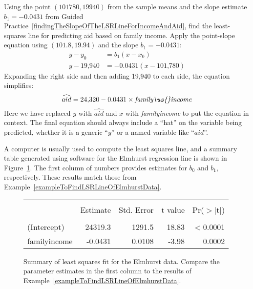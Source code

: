 \begin{examplewrap}
\begin{nexample}{Using the point $(101780, 19940)$
    from the sample means and the slope estimate
    $b_1 = -0.0431$ from Guided
    Practice~\ref{findingTheSlopeOfTheLSRLineForIncomeAndAid},
    find the least-squares line for predicting aid based
    on family income.}
  \label{exampleToFindLSRLineOfElmhurstData}%
  Apply the point-slope equation using $(101.8, 19.94)$
  and the slope $b_1 = -0.0431$:
  \begin{align*}
  y - y_0    &= b_1 (x - x_0) \\
  y - \text{19,940}  &= -0.0431(x - \text{101,780})
  \end{align*}
  Expanding the right side and then adding 19,940 to each side,
  the equation simplifies:
  \begin{align*}
  \widehat{aid} = \text{24,320} - 0.0431 \times
      \textit{family\us{}income}
  \end{align*}
  Here we have replaced $y$ with $\widehat{aid}$ and $x$ with
  \textit{family\us{}income} to put the equation in context.
  The final equation should always include a ``hat''
  on the variable being predicted, whether it is a generic
  ``$y$'' or a named variable like ``$aid$''.
\end{nexample}
\end{examplewrap}

A computer is usually used to compute the least squares line,
and a summary table generated using software for the Elmhurst
regression line is shown in
Figure~\ref{rOutputForIncomeAidLSRLine}.
The first column of numbers provides estimates for ${b}_0$
and ${b}_1$, respectively.
These results match those from
Example~\ref{exampleToFindLSRLineOfElmhurstData}.

\begin{figure}[ht]
\centering
\begin{tabular}{l rrrr}
  \hline
  \vspace{-3.7mm} & & & & \\
 & Estimate & Std. Error & t value & Pr($>$$|$t$|$) \\ 
  \hline
  \vspace{-3.6mm} & & & & \\
(Intercept) & 24319.3 & 1291.5 & 18.83 & $<$0.0001 \\ 
family\us{}income & -0.0431 & 0.0108 & -3.98 & 0.0002 \\ 
  \hline
\end{tabular}
\caption{Summary of least squares fit for the Elmhurst data.
    Compare the parameter estimates in the first column to
    the results of
    Example~\ref{exampleToFindLSRLineOfElmhurstData}.}
\label{rOutputForIncomeAidLSRLine}
\end{figure}


